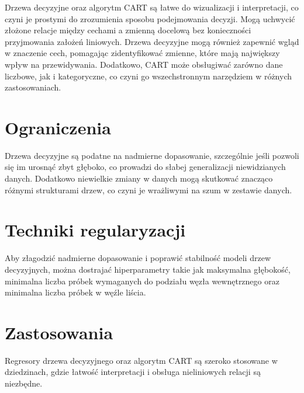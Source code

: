 \hspace{1.5cm} Drzewa decyzyjne oraz algorytm CART są łatwe do wizualizacji i interpretacji, co czyni je prostymi do zrozumienia sposobu podejmowania decyzji. Mogą uchwycić złożone relacje między cechami a zmienną docelową bez konieczności przyjmowania założeń liniowych. Drzewa decyzyjne mogą również zapewnić wgląd w znaczenie cech, pomagając zidentyfikować zmienne, które mają największy wpływ na przewidywania.
Dodatkowo, CART może obsługiwać zarówno dane liczbowe, jak i kategoryczne, co czyni go wszechstronnym narzędziem w różnych zastosowaniach.


{}
\section*{Ograniczenia }
\vspace{-1.0em}
\label{sec:ml_challenges}

\hspace{1.5cm} Drzewa decyzyjne są podatne na nadmierne dopasowanie, szczególnie jeśli pozwoli się im urosnąć zbyt głęboko, co prowadzi do słabej generalizacji niewidzianych danych. Dodatkowo niewielkie zmiany w danych mogą skutkować znacząco różnymi strukturami drzew, co czyni je wrażliwymi na szum w zestawie danych.

{}
\section*{Techniki regularyzacji \cite{url_DecisionTreeRegressor}}
\vspace{-1.0em}
\label{sec:ml_challenges}

\hspace{1.5cm} Aby złagodzić nadmierne dopasowanie i poprawić stabilność modeli drzew decyzyjnych, można dostrajać hiperparametry takie jak maksymalna głębokość, minimalna liczba próbek wymaganych do podziału węzła wewnętrznego oraz minimalna liczba próbek w węźle liścia.



{}
\section*{Zastosowania}
\vspace{-0.5em}
\label{sec:ml_challenges}

Regresory drzewa decyzyjnego oraz algorytm CART są szeroko stosowane w dziedzinach, gdzie łatwość interpretacji i obsługa nieliniowych relacji są niezbędne.

